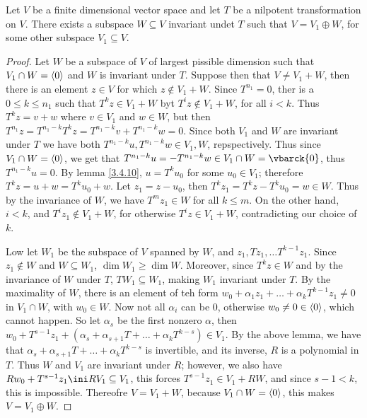 \begin{lemma}\label{3.4.11}
    Let $V$ be a finite dimensional vector space and let  $T$ be a  nilpotent
    transformation on $V$. There exists a subspace  $W \subseteq V$ invariant
    undet  $T$ such that $V=V_1 \oplus W$, for some other subspace $V_1
    \subseteq V$.
\end{lemma}
\begin{proof}
    Let $W$ be a subspace of  $V$ of largest pissible dimension such that  $V_1
    \cap W=\langle 0\rangle$ and $W$ is invariant under  $T$. Suppose then that  $V
    \neq V_1+W$, then there is an element $z \in V$ for which  $z \notin
    V_1+W$. Since $T^{n_1}=0$, ther is a $0 \leq k \leq n_1$ such that $T^kz
    \in V_1+W$ byt $T^iz \notin V_1+W$, for all $i<k$. Thus  $T^kz=v+w$ where
    $v \in V_1$ and $w \in W$, but then
    $T^{n_1}z=T^{n_1-k}T^kz=T^{n_1-k}v+T^{n_1-k}w=0$. Since both $V_1$ and $W$
    are invariant under $T$ we have both $T^{n_1-k}u, T^{n_1-k}w \in V_1,W$,
    repspectively. Thus since $V_1 \cap W=\langle 0\rangle$, we get that
    $T^{n_1-k}u=-T^{n_1-k}w \in V_1 \cap W = \vbarck{0}$, thus $T^{n_1-k}u=0$.
    By lemma \ref {3.4.10}, $u=T^ku_0$ for some $u_0 \in V_1$; therefore
    $T^kz=u+w=T^ku_0+w$. Let $z_1=z-u_0$, then $T^kz_1=T^kz-T^ku_0=w \in W$.
    Thus by the invariance of $W$, we have $T^mz_1 \in W$ for all $k \leq m$.
    On the other hand,  $i<k$, and  $T^iz_1 \notin V_1+W$, for otherwise $T^iz
    \in V_1+W$, contradicting our choice of $k$.

    Low let $W_1$ be the subspace of $V$ spanned by  $W$, and  $z_1, Tz_1,
    \dots T^{k-1}z_1$. Since $z_1 \notin W$ and $W \subseteq W_1$, $\dim{W_1}
    \geq \dim{W}$. Moreover, since $T^kz \in W$ and by the invariance of  $W$
    under  $T$,  $TW_1 \subseteq W_1$, making $W_1$ invariant under $T$. By the
    maximality of $W$, there is an element of teh form
    $w_0+\alpha_1z_1+\dots+\alpha_kT^{k-1}z_1 \neq 0$ in $V_1 \cap W$, with
    $w_0 \in W$. Now not all $\alpha_i$ can be  $0$, otherwise  $w_0 \neq 0 \in
    \langle 0\rangle$, which cannot happen. So let $\alpha_s$ be the first nonzero
    $\alpha$, then
    $w_0+T^{s-1}z_1+(\alpha_s+\alpha_{s+1}T+\dots+\alpha_kT^{k-s}) \in V_1$. By
    the above lemma, we have that
    $\alpha_s+\alpha_{s+1}T+\dots+\alpha_kT^{k-s}$ is invertible, and its
    inverse, $R$ is a polynomial in  $T$. Thus  $W$ and  $V_1$ are invariant
    under $R$; however, we also have  $Rw_0+T^{s-1}z_1 \ini RV_1 \subseteq
    V_1$, this forces $T^{s-1}z_1 \in V_1+RW$, and since $s-1<k$, this is
    impossible. Thereofre  $V=V_1+W$, because $V_1 \cap W=\langle 0\rangle$, this
    makes $V=V_1 \oplus W$.
\end{proof}

